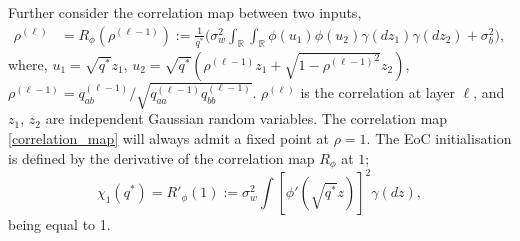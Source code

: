 \documentclass{article}
\theoremstyle{plain}
\theoremstyle{definition}
\theoremstyle{remark}
\begin{document}
Further consider the correlation map between two inputs, 
\begin{align}
    \rho^{(\ell)} &= R_\phi(\rho^{(\ell-1)}) := \frac{1}{q^*}\biggl({\sigma_w^2}\int_{\mathbb{R}}\int_{\mathbb{R}}  \phi \left(u_1 \right) \phi \left(u_2 \right)\gamma(dz_1)\gamma(dz_2)  + \sigma_b^2\biggr), \label{correlation_map}
\end{align}
where, $u_1 = \sqrt{q^*}z_1$, $u_2 = \sqrt{q^*}\left( \rho^{(\ell-1)}z_1 + \sqrt{1-{\rho^{(\ell-1)}}^2}z_2 \right)$, $\rho^{(\ell-1)} = {q^{(\ell-1)}_{ab}}/\sqrt{{q^{(\ell-1)}_{aa}q^{(\ell-1)}_{bb}}}$.
$\rho^{(\ell)}$ is the correlation at layer $\ell$, and $z_1$, $z_2$ are independent Gaussian random variables.
The correlation map \eqref{correlation_map} will always admit a fixed point at $\rho=1$. The EoC initialisation is defined by the derivative of the correlation map $R_\phi$ at $1$;
\begin{equation}
\label{chi_general_eq}
    {\chi}_1 \left(q^* \right)  = R'_{\phi}\left( 1 \right) := \sigma_w^2 \int \left[ \phi' \left( \sqrt{q^*}z \right) \right]^2 \gamma \left(dz \right),
\end{equation}
being equal to 1. 
\end{document}
